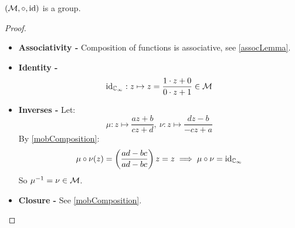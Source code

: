 \documentclass[../main.tex]{subfiles}
\begin{document}
\begin{theorem}
  $(\mathcal{M}, \circ, \mathrm{id})$ is a group.
\end{theorem}
\begin{proof}
  \begin{itemize}
    \item \textbf{Associativity -} Composition of functions is associative, see \cref{assocLemma}.
    \item \textbf{Identity -}
      \[
        \mathrm{id}_{\mathbb{C}_{\infty}}: z \mapsto z = \frac{1\cdot z + 0}{0 \cdot z + 1} \in \mathcal{M}
      \]
    \item \textbf{Inverses -} Let:
      \[
        \mu: z \mapsto \frac{az + b}{cz + d},\ \nu: z \mapsto \frac{dz - b}{-cz + a}
      \]
      By \cref{mobComposition}:
      \[
        \mu \circ \nu(z) = \left(\frac{ad - bc}{ad - bc}\right)z = z \implies \mu \circ \nu = \mathrm{id}_{\mathbb{C}_{\infty}}
      \]
      So $\mu^{-1} = \nu \in \mathcal{M}$.
    \item \textbf{Closure -} See \cref{mobComposition}.
  \end{itemize}
\end{proof}
\end{document}

